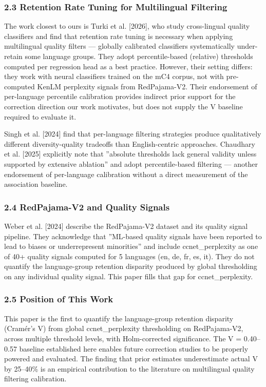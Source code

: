 \subsubsection{2.3 Retention Rate Tuning for Multilingual Filtering}

The work closest to ours is Turki et al. [2026], who study cross-lingual quality classifiers and find that retention rate tuning is necessary when applying multilingual quality filters --- globally calibrated classifiers systematically under-retain some language groups. They adopt percentile-based (relative) thresholds computed per regression head as a best practice. However, their setting differs: they work with neural classifiers trained on the mC4 corpus, not with pre-computed KenLM perplexity signals from RedPajama-V2. Their endorsement of per-language percentile calibration provides indirect prior support for the correction direction our work motivates, but does not supply the V baseline required to evaluate it.

Singh et al. [2024] find that per-language filtering strategies produce qualitatively different diversity-quality tradeoffs than English-centric approaches. Chaudhary et al. [2025] explicitly note that ''absolute thresholds lack general validity unless supported by extensive ablation'' and adopt percentile-based filtering --- another endorsement of per-language calibration without a direct measurement of the association baseline.

\subsubsection{2.4 RedPajama-V2 and Quality Signals}

Weber et al. [2024] describe the RedPajama-V2 dataset and its quality signal pipeline. They acknowledge that ''ML-based quality signals have been reported to lead to biases or underrepresent minorities'' and include ccnet\_perplexity as one of 40+ quality signals computed for 5 languages (en, de, fr, es, it). They do not quantify the language-group retention disparity produced by global thresholding on any individual quality signal. This paper fills that gap for ccnet\_perplexity.

\subsubsection{2.5 Position of This Work}

This paper is the first to quantify the language-group retention disparity (Cramér's V) from global ccnet\_perplexity thresholding on RedPajama-V2, across multiple threshold levels, with Holm-corrected significance. The V = 0.40--0.57 baseline established here enables future correction studies to be properly powered and evaluated. The finding that prior estimates underestimate actual V by 25--40\% is an empirical contribution to the literature on multilingual quality filtering calibration.

